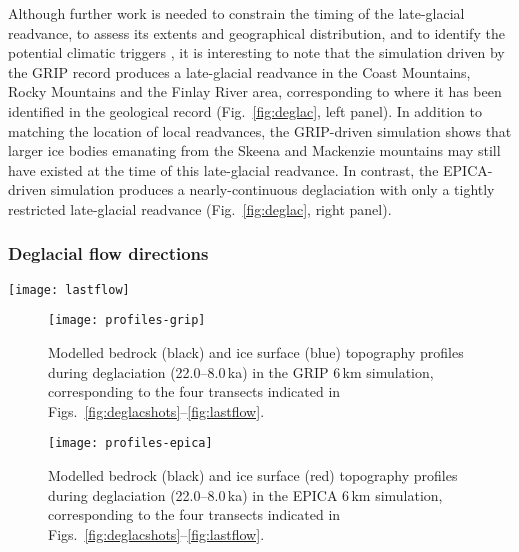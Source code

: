 \documentclass[tc]{copernicus}
\begin{document}
Although further work is needed to constrain the timing of the late-glacial
readvance, to assess its extents and geographical distribution, and to identify
the potential climatic triggers \citep{Menounos.etal.2008}, it is interesting
to note that the simulation driven by the GRIP record produces a late-glacial
readvance in the Coast Mountains, Rocky Mountains and the Finlay River area,
corresponding to where it has been identified in the geological record
(Fig.~\ref{fig:deglac}, left panel). In addition to matching the location of
local readvances, the GRIP-driven simulation shows that larger ice bodies
emanating from the Skeena and Mackenzie mountains may still have existed at the
time of this late-glacial readvance.
In contrast, the EPICA-driven simulation produces a nearly-continuous
deglaciation with only a tightly restricted late-glacial readvance
(Fig.~\ref{fig:deglac}, right panel).


\subsubsection{Deglacial flow directions}

\begin{figure*}
  \texttt{[image: lastflow]}
  \caption{Modelled of the deglacial basal ice velocities. Hatches
           indicate areas that remain non-sliding throughout deglaciation
           (22.0--8.0\,ka), notably including the Interior Plateau (IP).
           Note the concentric patterns of deglacial flow in the Liard
           Lowland (LL).
           Sliding grid cells were distinguished from non-sliding grid cells
           using a velocity threshold of 1\,\unit{m\,yr^{-1}}.
           Dashed segments indicate the location of profiles used in
           Figs.~\ref{fig:profiles-grip} and~\ref{fig:profiles-epica}.}
  \label{fig:lastflow}
\end{figure*}

\begin{figure}
  \texttt{[image: profiles-grip]}
  \caption{Modelled bedrock (black) and ice surface (blue) topography profiles
           during deglaciation (22.0--8.0\,ka) in the GRIP 6\,km
           simulation, corresponding to the four transects indicated in
           Figs.~\ref{fig:deglacshots}--\ref{fig:lastflow}.}
  \label{fig:profiles-grip}
\end{figure}

\begin{figure}
  \texttt{[image: profiles-epica]}
  \caption{Modelled bedrock (black) and ice surface (red) topography profiles
           during deglaciation (22.0--8.0\,ka) in the EPICA 6\,km
           simulation, corresponding to the four transects indicated in
           Figs.~\ref{fig:deglacshots}--\ref{fig:lastflow}.}
  \label{fig:profiles-epica}
\end{figure}
\end{document}
